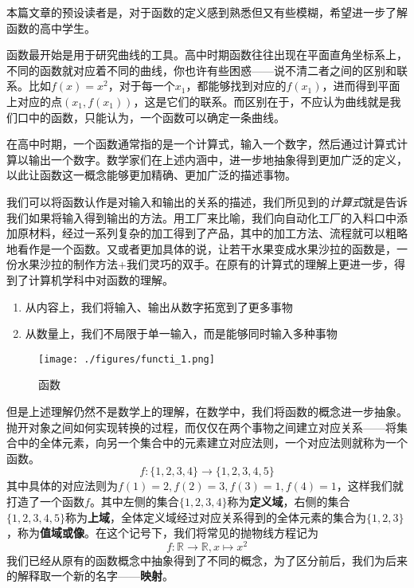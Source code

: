 

\begin{issues}
\issueDraft
\issueTODO
\end{issues}

本篇文章的预设读者是，对于函数的定义感到熟悉但又有些模糊，希望进一步了解函数的高中学生。

函数最开始是用于研究曲线的工具。高中时期函数往往出现在平面直角坐标系上，不同的函数就对应着不同的曲线，你也许有些困惑——说不清二者之间的区别和联系。比如$f(x)=x^2$，对于每一个$x_1$，都能够找到对应的$f(x_1)$，进而得到平面上对应的点$(x_1,f(x_1))$，这是它们的联系。而区别在于，不应认为曲线就是我们口中的函数，只能认为，一个函数可以确定一条曲线。

在高中时期，一个函数通常指的是一个计算式，输入一个数字，然后通过计算式计算以输出一个数字。数学家们在上述内涵中，进一步地抽象得到更加广泛的定义，以此让函数这一概念能够更加精确、更加广泛的描述事物。

我们可以将函数认作是对输入和输出的关系的描述，我们所见到的\textsl{计算式}就是告诉我们如果将输入得到输出的方法。用工厂来比喻，我们向自动化工厂的入料口中添加原材料，经过一系列复杂的加工得到了产品，其中的加工方法、流程就可以粗略地看作是一个函数。又或者更加具体的说，让若干水果变成水果沙拉的函数是，一份水果沙拉的制作方法+我们灵巧的双手。在原有的计算式的理解上更进一步，得到了计算机学科中对函数的理解。
\begin{enumerate}
\item 从内容上，我们将输入、输出从数字拓宽到了更多事物
\item 从数量上，我们不局限于单一输入，而是能够同时输入多种事物
\end{enumerate}


\begin{figure}[ht]
\centering
\texttt{[image: ./figures/functi\_1.png]}
\caption{函数} \label{functi_fig1}
\end{figure}

但是上述理解仍然不是数学上的理解，在数学中，我们将函数的概念进一步抽象。抛开对象之间如何实现转换的过程，而仅仅在两个事物之间建立对应关系——将集合中的全体元素，向另一个集合中的元素建立对应法则，一个对应法则就称为一个函数。
$$f:\{1,2,3,4\}\to\{1,2,3,4,5\}$$
其中具体的对应法则为$f(1)=2,f(2)=3,f(3)=1,f(4)=1$，这样我们就打造了一个函数$f$。其中左侧的集合$\{1,2,3,4\}$称为\textbf{定义域}，右侧的集合$\{1,2,3,4,5\}$称为\textbf{上域}，全体定义域经过对应关系得到的全体元素的集合为$\{1,2,3\}$，称为\textbf{值域或像}。在这个记号下，我们将常见的抛物线方程记为
\begin{equation}
f:\mathbb{R}\to{\mathbb{R}},x\mapsto{x^2}
\end{equation}
我们已经从原有的函数概念中抽象得到了不同的概念，为了区分前后，我们为后来的解释取一个新的名字——\textbf{映射}。

